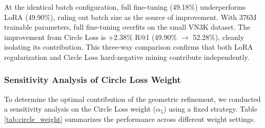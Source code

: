 \documentclass{article}
\begin{document}
\begin{table}[H]
    \centering
    \vspace{-0.5em}
    \caption{Control experiment isolating LoRA regularization from batch-size effects on 3000VnPersonSearch. All methods use effective batch size 72.}
    \label{tab:control_ft}
    \vspace{-1em}
\end{table}

At the identical batch configuration, full fine-tuning (49.18\%) underperforms LoRA (49.90\%), ruling out batch size as the source of improvement. With 376M trainable parameters, full fine-tuning overfits on the small VN3K dataset. The improvement from Circle Loss is +2.38\% R@1 (49.90\% $\to$ 52.28\%), cleanly isolating its contribution. This three-way comparison confirms that both LoRA regularization and Circle Loss hard-negative mining contribute independently.

\subsubsection{Sensitivity Analysis of Circle Loss Weight}
To determine the optimal contribution of the geometric refinement, we conducted a sensitivity analysis on the Circle Loss weight ($\alpha_5$) using a fixed strategy. Table \ref{tab:circle_weight} summarizes the performance across different weight settings.
\end{document}
